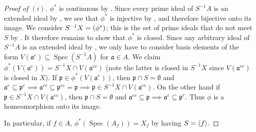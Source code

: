 \documentclass[12pt,letterpaper]{article}
\theoremstyle{definition}
\theoremstyle{remark}
\numberwithin{equation}{section}
\numberwithin{figure}{problem}
\let\Im\relax
\DeclareMathOperator{\Im}{im}
\DeclareMathOperator{\Spec}{Spec}
\begin{document}
\begin{proof}[Proof of $(i)$]
  $\phi^*$ is continuous by \cite[Exc.~1.21i]{AM69}. Since every prime ideal of $S^{-1}A$ is an extended ideal by \cite[Prop.~3.11i]{AM69}, we see that $\phi^*$ is injective by \cite[Exc.~3.20ii]{AM69}, and therefore bijective onto its image. We consider $S^{-1}X = \Im(\phi^*)$; this is the set of prime ideals that do not meet $S$ by \cite[Prop.~3.11iv]{AM69}. It therefore remains to show that $\phi^*$ is closed. Since any arbitrary ideal of $S^{-1}A$ is an extended ideal by \cite[Prop.~3.11i]{AM69}, we only have to consider basis elements of the form $V(\mathfrak{a}^e) \subseteq \Spec(S^{-1}A)$ for $\mathfrak{a} \in A$. We claim $\phi^*(V(\mathfrak{a}^e)) = S^{-1}X \cap V(\mathfrak{a}^{ec})$ (note the latter is closed in $S^{-1}X$ since $V(\mathfrak{a}^{ec})$ is closed in $X$). If $\mathfrak{p} \in \phi^*(V(\mathfrak{a}^e))$, then $\mathfrak{p} \cap S = \emptyset$ and $\mathfrak{a}^e \subseteq \mathfrak{p}^e \implies \mathfrak{a}^{ec} \subseteq \mathfrak{p}^{ec} = \mathfrak{p} \implies \mathfrak{p} \in S^{-1}X \cap V(\mathfrak{a}^{ec})$. On the other hand if $\mathfrak{p} \in S^{-1}X \cap V(\mathfrak{a}^{ec})$, then $\mathfrak{p} \cap S = \emptyset$ and $\mathfrak{a}^{ec} \subseteq \mathfrak{p} \implies \mathfrak{a}^e \subseteq \mathfrak{p}^e$. Thus $\phi$ is a homeomorphism onto its image.
  \par In particular, if $f \in A$, $\phi^*(\Spec(A_f)) = X_f$ by having $S = \braket{f}$.
\end{proof}
\end{document}
